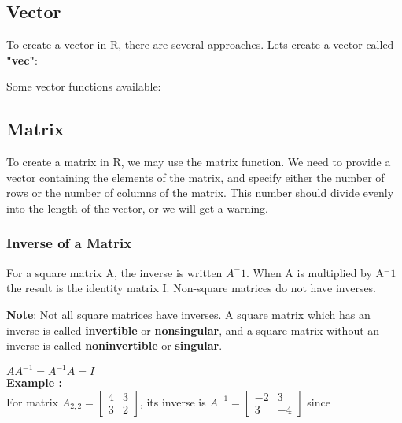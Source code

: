 \documentclass[12pt, right open]{memoir}
\begin{document}
\subsection{Vector}
To create a vector in R, there are several approaches. 
Lets create a vector called \textbf{"vec"}:


Some vector functions available:


\subsection{Matrix}
To create a matrix in R, we may use the matrix function.  We need to provide a vector containing the elements of the matrix, and specify either the number of rows or the number of columns of the matrix.  This number should divide evenly into the length of the vector, or we will get a warning.  \\


\subsubsection{Inverse of a Matrix}
For a square matrix A, the inverse is written $A^-1$. When A is multiplied by A$^-1$ the result is the identity matrix I. Non-square matrices do not have inverses.

\textbf{Note}: Not all square matrices have inverses. A square matrix which has an inverse is called \textbf{invertible} or \textbf{nonsingular}, and a square matrix without an inverse is called \textbf{noninvertible} or \textbf{singular}.

$AA^{-1} = A^{-1}A = I$ \\
\textbf{Example :} \\
For matrix 
$
A_{2,2} = 
\begin{bmatrix}
4 & 3 \\
3 & 2 
\end{bmatrix}
$, its inverse is 
$A^{-1} =
\begin{bmatrix}
-2 & 3 \\
3 & -4 
\end{bmatrix}
$ since \\ \\
\end{document}

